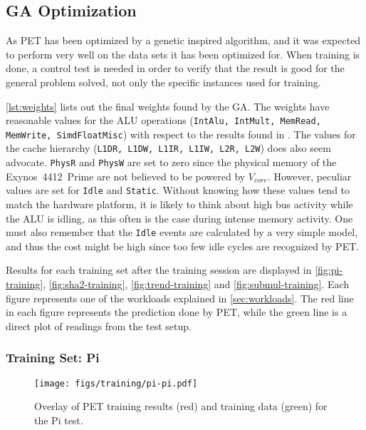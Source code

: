 \subsection{GA Optimization}

As PET has been optimized by a genetic inspired algorithm, and it was expected
to perform very well on the data sets it has been optimized for. When training
is done, a control test is needed in order to verify that the result is good for
the general problem solved, not only the specific instances used for training.

\autoref{lst:weights} lists out the final weights found by the GA. The weights
have reasonable values for the ALU operations (\texttt{IntAlu, IntMult, MemRead,
MemWrite, SimdFloatMisc}) with respect to the results found in
\cite{rundehvatum2013exploring}.  The values for the cache hierarchy
(\texttt{L1DR, L1DW, L1IR, L1IW, L2R, L2W}) does also seem advocate.
\texttt{PhysR} and \texttt{PhysW} are set to zero since the physical memory of
the Exynos~4412~Prime are not believed to be powered by $V_{core}$. However,
peculiar values are set for \texttt{Idle} and \texttt{Static}. Without knowing
how these values tend to match the hardware platform, it is likely to think
about high bus activity while the ALU is idling, as this often is the case
during intense memory activity.  One must also remember that the \texttt{Idle}
events are calculated by a very simple model, and thus the cost might be high
since too few idle cycles are recognized by PET.



Results for each training set after the training session are displayed in \autoref{fig:pi-training},
\autoref{fig:sha2-training}, \autoref{fig:trend-training} and
\autoref{fig:submul-training}. Each figure represents one of the workloads
explained in \autoref{sec:workloads}. The red line in each figure represents the
prediction done by PET, while the green line is a direct plot of readings from
the test setup.


\newpage

\subsubsection{Training Set: Pi}
\begin{figure}[htb]
    \centering
    \texttt{[image: figs/training/pi-pi.pdf]}
    \caption{Overlay of PET training results (red) and training data (green) for the Pi test.}
    \label{fig:pi-training}
\end{figure}

